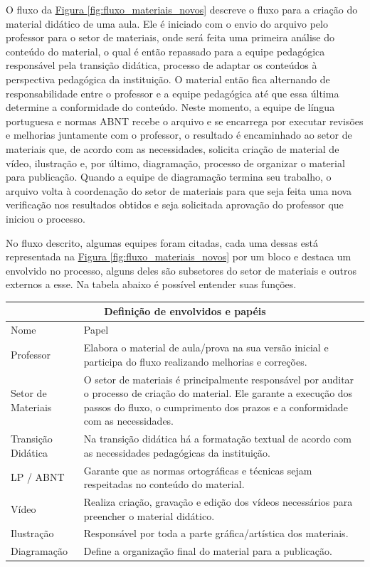 O fluxo da \hyperref[fig:fluxo_materiais_novos]{Figura \ref{fig:fluxo_materiais_novos}}  descreve o fluxo para a criação do material didático de uma aula. Ele é iniciado com o envio do arquivo pelo professor para o setor de materiais, onde será feita uma primeira análise do conteúdo do material, o qual é então repassado para a equipe pedagógica responsável pela transição didática, processo de adaptar os conteúdos à perspectiva pedagógica da instituição. O material então fica alternando de responsabilidade entre o professor e a equipe pedagógica até que essa última determine a conformidade do conteúdo. Neste momento, a equipe de língua portuguesa e normas ABNT recebe o arquivo e se encarrega por executar revisões e melhorias juntamente com o professor, o resultado é encaminhado ao setor de materiais que, de acordo com as necessidades, solicita criação de material de vídeo, ilustração e, por último, diagramação, processo de organizar o material para publicação. Quando a equipe de diagramação termina seu trabalho, o arquivo volta à coordenação do setor de materiais para que seja feita uma nova verificação nos resultados obtidos e seja solicitada aprovação do professor que iniciou o processo.

No fluxo descrito, algumas equipes foram citadas, cada uma dessas está representada na \hyperref[fig:fluxo_materiais_novos]{Figura \ref{fig:fluxo_materiais_novos}} por um bloco e destaca um envolvido no processo, alguns deles são subsetores do setor de materiais e outros externos a esse. Na tabela abaixo é possível entender suas funções.

\begin{center}
    \begin{tabularx}{\textwidth}{ |X|X| }
    \hline
    \multicolumn{2}{|c|}{Definição de envolvidos e papéis} \\
    \hline
    Nome & Papel \\ \hline
    Professor & Elabora o material de aula/prova na sua versão inicial e participa do fluxo realizando melhorias e correções. \\ \hline
    Setor de Materiais & O setor de materiais é principalmente responsável por auditar o processo de criação do material. Ele garante a execução dos passos do fluxo, o cumprimento dos prazos e a conformidade com as necessidades. \\ \hline
    Transição Didática & Na transição didática há a formatação textual de acordo com as necessidades pedagógicas da instituição.  \\ \hline
    LP / ABNT & Garante que as normas ortográficas e técnicas sejam respeitadas no conteúdo do material. \\ \hline
    Vídeo & Realiza criação, gravação e edição dos vídeos necessários para preencher o material didático. \\ \hline
   	Ilustração & Responsável por toda a parte gráfica/artística dos materiais. \\ \hline
   	Diagramação & Define a organização final do material para a publicação. \\ \hline
    \end{tabularx}
\end{center}

